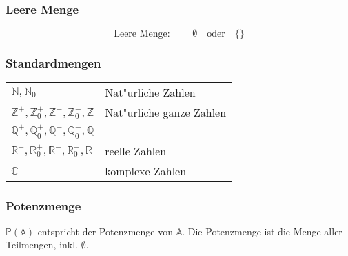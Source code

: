\subsubsection{Leere Menge}
\begin{equation}
	\text{Leere Menge: }\qquad\emptyset\quad\text{oder}\quad\{\}
\end{equation}

\subsubsection{Standardmengen}
\begin{center}
	\begin{tabular}{ll}
		$\mathbb{N}, \mathbb{N}_0$		& Nat"urliche Zahlen \\
		$\mathbb{Z}^+, \mathbb{Z}_0^+, \mathbb{Z}^-, \mathbb{Z}_0^-, \mathbb{Z}$	& Nat"urliche ganze Zahlen \\
		$\mathbb{Q}^+, \mathbb{Q}_0^+, \mathbb{Q}^-, \mathbb{Q}_0^-, \mathbb{Q}$	& \\
		$\mathbb{R}^+, \mathbb{R}_0^+, \mathbb{R}^-, \mathbb{R}_0^-, \mathbb{R}$	& reelle Zahlen \\
		$\mathbb{C}$					& komplexe Zahlen
	\end{tabular}
\end{center}

\subsubsection{Potenzmenge}
$\mathbb{P}(\mathbb{A})$ entspricht der Potenzmenge von $\mathbb{A}$. Die Potenzmenge
ist die Menge aller Teilmengen, inkl. $\emptyset$.

